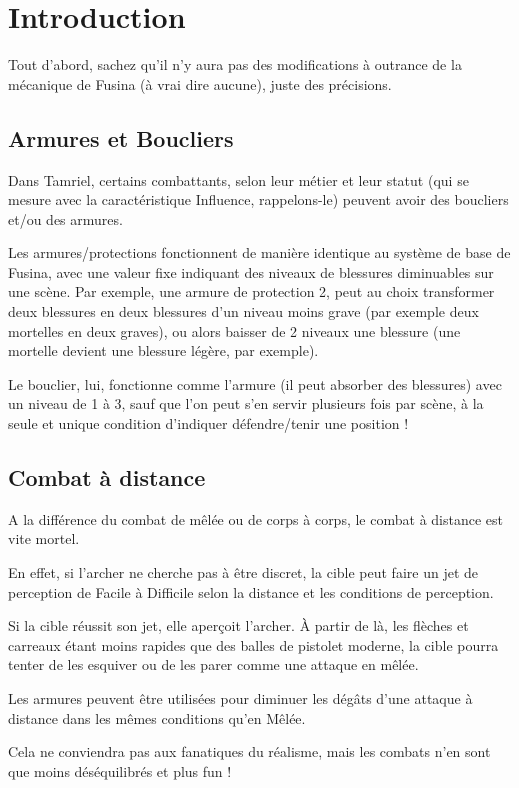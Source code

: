 \chapter{Introduction}

Tout d'abord, sachez qu'il n'y aura pas des modifications à outrance de la mécanique de Fusina (à vrai dire aucune), juste des précisions.

\section{Armures et Boucliers}

Dans Tamriel, certains combattants, selon leur métier et leur statut (qui se mesure avec la caractéristique Influence, rappelons-le) peuvent avoir des boucliers et/ou des armures.

Les armures/protections fonctionnent de manière identique au système de base de Fusina, avec une valeur fixe indiquant des niveaux de blessures diminuables sur une scène. Par exemple, une armure de protection 2, peut au choix transformer deux blessures en deux blessures d'un niveau moins grave (par exemple deux mortelles en deux graves), ou alors baisser de 2 niveaux une blessure (une mortelle devient une blessure légère, par exemple).

Le bouclier, lui, fonctionne comme l'armure (il peut absorber des blessures) avec un niveau de 1 à 3, sauf que l'on peut s'en servir plusieurs fois par scène, à la seule et unique condition d'indiquer défendre/tenir une position !

\section{Combat à distance}

A la différence du combat de mêlée ou de corps à corps, le combat à distance est vite mortel.

En effet, si l'archer ne cherche pas à être discret, la cible peut faire un jet de perception de Facile à Difficile selon la distance et les conditions de perception.

Si la cible réussit son jet, elle aperçoit l'archer. À partir de là, les flèches et carreaux étant moins rapides que des balles de pistolet moderne, la cible pourra tenter de les esquiver ou de les parer comme une attaque en mêlée.

Les armures peuvent être utilisées pour diminuer les dégâts d'une attaque à distance dans les mêmes conditions qu'en Mêlée.

Cela ne conviendra pas aux fanatiques du réalisme, mais les combats n'en sont que moins déséquilibrés et plus fun !
